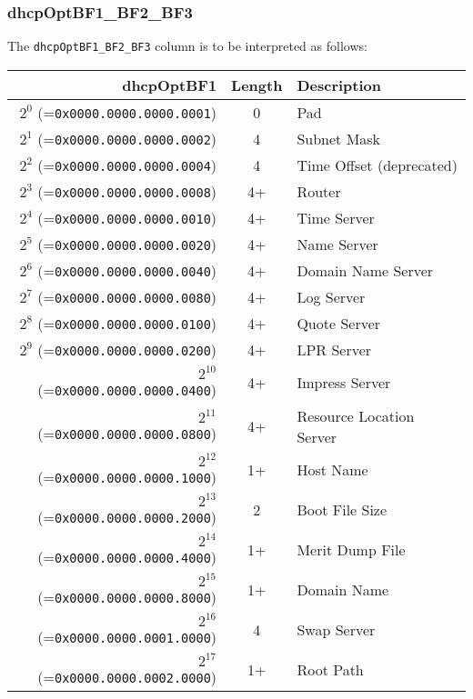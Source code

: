 \documentclass[documentation]{subfiles}
\begin{document}
\subsubsection{dhcpOptBF1\_BF2\_BF3}\label{dhcpOptBF}
The {\tt dhcpOptBF1\_BF2\_BF3} column is to be interpreted as follows:
\begin{small}
    \begin{longtable}{rcl}
        \toprule
        {\bf dhcpOptBF1} & {\bf Length} & {\bf Description}\\
        \midrule\endhead%
        $2^{0}$  (={\tt 0x0000.0000.0000.0001}) & 0     & Pad \\
        $2^{1}$  (={\tt 0x0000.0000.0000.0002}) & 4     & Subnet Mask \\
        $2^{2}$  (={\tt 0x0000.0000.0000.0004}) & 4     & Time Offset (deprecated) \\
        $2^{3}$  (={\tt 0x0000.0000.0000.0008}) & 4+    & Router \\
        $2^{4}$  (={\tt 0x0000.0000.0000.0010}) & 4+    & Time Server \\
        $2^{5}$  (={\tt 0x0000.0000.0000.0020}) & 4+    & Name Server \\
        $2^{6}$  (={\tt 0x0000.0000.0000.0040}) & 4+    & Domain Name Server \\
        $2^{7}$  (={\tt 0x0000.0000.0000.0080}) & 4+    & Log Server \\
        $2^{8}$  (={\tt 0x0000.0000.0000.0100}) & 4+    & Quote Server\\
        $2^{9}$  (={\tt 0x0000.0000.0000.0200}) & 4+    & LPR Server \\
        $2^{10}$ (={\tt 0x0000.0000.0000.0400}) & 4+    & Impress Server \\
        $2^{11}$ (={\tt 0x0000.0000.0000.0800}) & 4+    & Resource Location Server \\
        $2^{12}$ (={\tt 0x0000.0000.0000.1000}) & 1+    & Host Name \\
        $2^{13}$ (={\tt 0x0000.0000.0000.2000}) & 2     & Boot File Size \\
        $2^{14}$ (={\tt 0x0000.0000.0000.4000}) & 1+    & Merit Dump File \\
        $2^{15}$ (={\tt 0x0000.0000.0000.8000}) & 1+    & Domain Name \\
        $2^{16}$ (={\tt 0x0000.0000.0001.0000}) & 4     & Swap Server \\
        $2^{17}$ (={\tt 0x0000.0000.0002.0000}) & 1+    & Root Path \\

\end{longtable}
\end{small}
\end{document}
